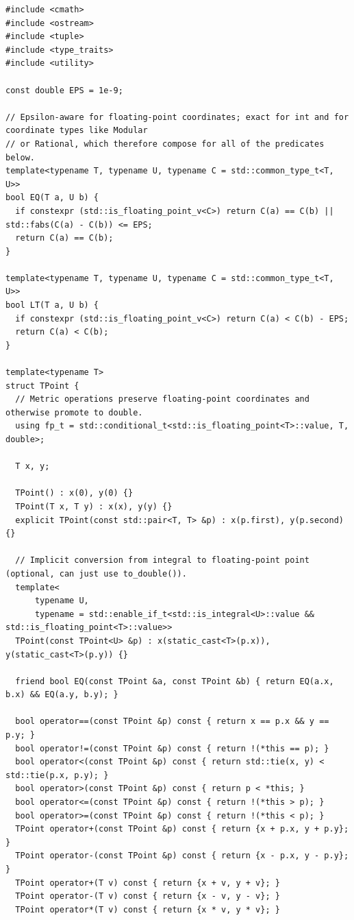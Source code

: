 \begin{lstlisting}[style=cpp]
#include <cmath>
#include <ostream>
#include <tuple>
#include <type_traits>
#include <utility>

const double EPS = 1e-9;

// Epsilon-aware for floating-point coordinates; exact for int and for coordinate types like Modular
// or Rational, which therefore compose for all of the predicates below.
template<typename T, typename U, typename C = std::common_type_t<T, U>>
bool EQ(T a, U b) {
  if constexpr (std::is_floating_point_v<C>) return C(a) == C(b) || std::fabs(C(a) - C(b)) <= EPS;
  return C(a) == C(b);
}

template<typename T, typename U, typename C = std::common_type_t<T, U>>
bool LT(T a, U b) {
  if constexpr (std::is_floating_point_v<C>) return C(a) < C(b) - EPS;
  return C(a) < C(b);
}

template<typename T>
struct TPoint {
  // Metric operations preserve floating-point coordinates and otherwise promote to double.
  using fp_t = std::conditional_t<std::is_floating_point<T>::value, T, double>;

  T x, y;

  TPoint() : x(0), y(0) {}
  TPoint(T x, T y) : x(x), y(y) {}
  explicit TPoint(const std::pair<T, T> &p) : x(p.first), y(p.second) {}

  // Implicit conversion from integral to floating-point point (optional, can just use to_double()).
  template<
      typename U,
      typename = std::enable_if_t<std::is_integral<U>::value && std::is_floating_point<T>::value>>
  TPoint(const TPoint<U> &p) : x(static_cast<T>(p.x)), y(static_cast<T>(p.y)) {}

  friend bool EQ(const TPoint &a, const TPoint &b) { return EQ(a.x, b.x) && EQ(a.y, b.y); }

  bool operator==(const TPoint &p) const { return x == p.x && y == p.y; }
  bool operator!=(const TPoint &p) const { return !(*this == p); }
  bool operator<(const TPoint &p) const { return std::tie(x, y) < std::tie(p.x, p.y); }
  bool operator>(const TPoint &p) const { return p < *this; }
  bool operator<=(const TPoint &p) const { return !(*this > p); }
  bool operator>=(const TPoint &p) const { return !(*this < p); }
  TPoint operator+(const TPoint &p) const { return {x + p.x, y + p.y}; }
  TPoint operator-(const TPoint &p) const { return {x - p.x, y - p.y}; }
  TPoint operator+(T v) const { return {x + v, y + v}; }
  TPoint operator-(T v) const { return {x - v, y - v}; }
  TPoint operator*(T v) const { return {x * v, y * v}; }


\end{lstlisting}
